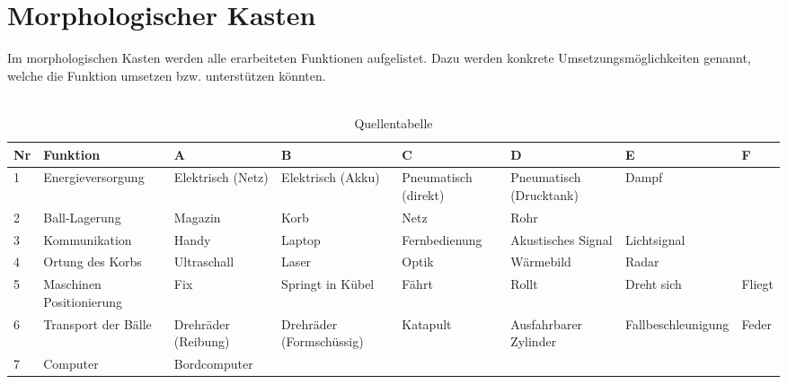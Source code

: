 \section{Morphologischer Kasten}
Im morphologischen Kasten werden alle erarbeiteten Funktionen aufgelistet. Dazu werden konkrete Umsetzungsmöglichkeiten genannt, welche die Funktion umsetzen bzw. unterstützen könnten.\\
\\

\begin{table}[h!]
	\centering
	\begin{tabular}{l l l l l l l l}
		Nr & Funktion & A & B & C & D & E & F \\
		\hline
		
		1 & Energieversorgung & Elektrisch (Netz) & Elektrisch (Akku) & Pneumatisch (direkt) & Pneumatisch (Drucktank) & Dampf & \\
		
		2 & Ball-Lagerung & Magazin & Korb & Netz & Rohr & & \\
		
		3 & Kommunikation & Handy & Laptop & Fernbedienung & Akustisches Signal & Lichtsignal & \\
		
		4 & Ortung des Korbs & Ultraschall & Laser & Optik & Wärmebild & Radar & \\
		
		5 & Maschinen Positionierung & Fix & Springt in Kübel & Fährt & Rollt & Dreht sich & Fliegt \\
		
		6 & Transport der Bälle & Drehräder (Reibung) & Drehräder (Formschüssig) & Katapult & Ausfahrbarer Zylinder & Fallbeschleunigung & Feder \\
		
		7 & Computer & Bordcomputer & & & & & \\
		
	\end{tabular}
	\caption{Quellentabelle}
	\label{tab:quelle}
\end{table}
